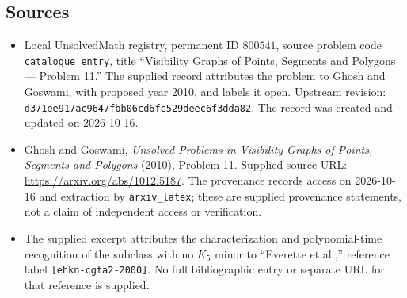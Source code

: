 \documentclass[11pt]{article}
\begin{document}
\subsection{Sources}
\begin{itemize}
\item Local UnsolvedMath registry, permanent ID \(800541\), source problem code \texttt{catalogue entry}, title ``Visibility Graphs of Points, Segments and Polygons --- Problem 11.'' The supplied record attributes the problem to Ghosh and Goswami, with proposed year 2010, and labels it open. Upstream revision: \texttt{d371ee917ac9647fbb06cd6fc529deec6f3dda82}. The record was created and updated on 2026-10-16.
\item Ghosh and Goswami, \emph{Unsolved Problems in Visibility Graphs of Points, Segments and Polygons} (2010), Problem 11. Supplied source URL: \url{https://arxiv.org/abs/1012.5187}. The provenance records access on 2026-10-16 and extraction by \texttt{arxiv\_latex}; these are supplied provenance statements, not a claim of independent access or verification.
\item The supplied excerpt attributes the characterization and polynomial-time recognition of the subclass with no \(K_5\) minor to ``Everette et al.,'' reference label \texttt{[ehkn-cgta2-2000]}. No full bibliographic entry or separate URL for that reference is supplied.
\end{itemize}
\end{document}
